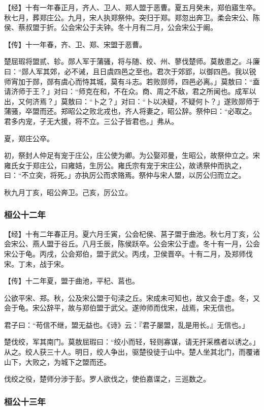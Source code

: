 \documentclass[]{article}
\begin{document}
【经】十有一年春正月，齐人、卫人、郑人盟于恶曹。夏五月癸未，郑伯寤生卒。秋七月，葬郑庄公。九月，宋人执郑祭仲。突归于郑。郑忽出奔卫。柔会宋公、陈侯、蔡叔盟于折。公会宋公于夫钟。冬十月有二月，公会宋公于阚。

【传】十一年春，齐、卫、郑、宋盟于恶曹。

楚屈瑕将盟贰、轸。郧人军于蒲骚，将与随、绞、州、蓼伐楚师。莫敖患之。斗廉曰：``郧人军其郊，必不诫，且日虞四邑之至也。君次于郊郢，以御四邑。我以锐师宵加于郧，郧有虞心而恃其城，莫有斗志。若败郧师，四邑必离。」莫敖曰：``盍请济师于王？」对曰：``师克在和，不在众。商、周之不敌，君之所闻也。成军以出，又何济焉？」莫敖曰：``卜之？」对曰：``卜以决疑，不疑何卜？」遂败郧师于蒲骚，卒盟而还。郑昭公之败北戎也，齐人将妻之，昭公辞。祭仲曰：``必取之。君多内宠，子无大援，将不立。三公子皆君也。」弗从。

夏，郑庄公卒。

初，祭封人仲足有宠于庄公，庄公使为卿。为公娶邓曼，生昭公，故祭仲立之。宋雍氏女于郑庄公，曰雍姞，生厉公。雍氏宗有宠于宋庄公，故诱祭仲而执之，曰：``不立突，将死。」亦执厉公而求赂焉。祭仲与宋人盟，以厉公归而立之。

秋九月丁亥，昭公奔卫。己亥，厉公立。

\hypertarget{header-n281}{%
\subsubsection{桓公十二年}\label{header-n281}}

【经】十有二年春正月。夏六月壬寅，公会杞侯、莒子盟于曲池。秋七月丁亥，公会宋公、燕人盟于谷丘。八月壬辰，陈侯跃卒。公会宋公于虚。冬十有一月，公会宋公于龟。丙戌，公会郑伯，盟于武父。丙戌，卫侯晋卒。十有二月，及郑师伐宋。丁未，战于宋。

【传】十二年夏，盟于曲池，平杞、莒也。

公欲平宋、郑。秋，公及宋公盟于句渎之丘。宋成未可知也，故又会于虚。冬，又会于龟。宋公辞平，故与郑伯盟于武父。遂帅师而伐宋，战焉，宋无信也。

君子曰：``苟信不继，盟无益也。《诗》云：『君子屡盟，乱是用长。』无信也。」

楚伐绞，军其南门。莫敖屈瑕曰：``绞小而轻，轻则寡谋，请无扞采樵者以诱之。」从之。绞人获三十人。明日，绞人争出，驱楚役徒于山中。楚人坐其北门，而覆诸山下，大败之，为城下之盟而还。

伐绞之役，楚师分涉于彭。罗人欲伐之，使伯嘉谍之，三巡数之。

\hypertarget{header-n290}{%
\subsubsection{桓公十三年 }\label{header-n290}}
\end{document}
